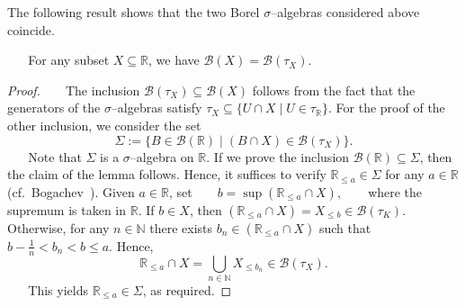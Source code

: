 The following result shows that the two Borel $\sigma$--algebras considered above coincide.

\begin{lemma}\label{lemma::Borel-identities}
    For any subset $X\subseteq\mathbb{R}$, we have $\mathcal{B}(X)=\mathcal{B}(\tau_X)$.
\end{lemma}
\begin{proof}
    The inclusion $\mathcal{B}(\tau_X)\subseteq\mathcal{B}(X)$ follows from the fact that the generators of the $\sigma$--algebras satisfy $\tau_X\subseteq \{U\cap X\mid U\in\tau_\mathbb{R}\}$. For the proof of the other inclusion, we consider the set $$\Sigma:=\{B\in\mathcal{B}(\mathbb{R})\mid (B\cap X)\in\mathcal{B}(\tau_X)\}.$$
    Note that $\Sigma$ is a $\sigma$--algebra on $\mathbb{R}$. If we prove the inclusion $\mathcal{B}(\mathbb{R})\subseteq\Sigma$, then the claim of the lemma follows. Hence, it suffices to verify $\mathbb{R}_{\leq a}\in \Sigma$ for any $a\in\mathbb{R}$ (cf.\ Bogachev~\cite[Lemma~1.2.11]{Bogachev1}). Given $a\in\mathbb{R}$, set
    $b=\sup (\mathbb{R}_{\leq a}\cap X),$
    where the supremum is taken in $\mathbb{R}$. If $b\in X$, then $(\mathbb{R}_{\leq a}\cap X)=X_{\leq b}\in\mathcal{B}(\tau_K)$. Otherwise, for any $n\in\mathbb{N}$ there exists $b_n\in(\mathbb{R}_{\leq a}\cap X)$ such that $b-\frac{1}{n}<b_n< b\leq a$. Hence,
    $$\mathbb{R}_{\leq a}\cap X=\bigcup\limits_{n\in\mathbb{N}} X_{\leq b_n}\in\mathcal{B}(\tau_{X}).$$
    This yields $\mathbb{R}_{\leq a}\in\Sigma$, as required.
\end{proof}








